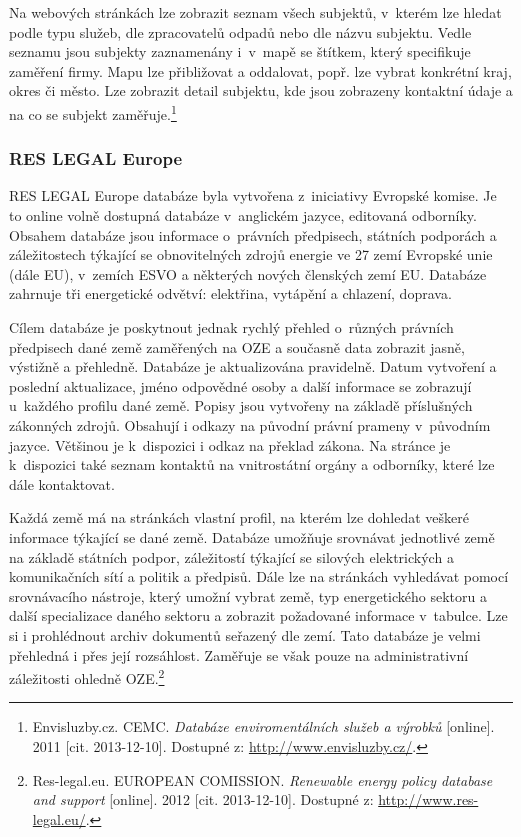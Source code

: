 \documentclass[11pt,a4paper]{article}
\begin{document}
Na webových stránkách lze zobrazit seznam všech subjektů, v~kterém lze hledat podle typu služeb, dle zpracovatelů odpadů nebo dle názvu subjektu. Vedle seznamu jsou subjekty zaznamenány i~v~mapě se štítkem, který specifikuje zaměření firmy. Mapu lze přibližovat a oddalovat, popř. lze vybrat konkrétní kraj, okres či město. Lze zobrazit detail subjektu, kde jsou zobrazeny kontaktní údaje a na co se subjekt zaměřuje.\footnote{Envisluzby.cz. CEMC. \textit{Databáze enviromentálních služeb a výrobků} [online]. 2011 [cit. 2013-12-10]. Dostupné z: \url{http://www.envisluzby.cz/}.}

\subsubsection{RES LEGAL Europe}
RES LEGAL Europe databáze byla vytvořena z~iniciativy Evropské komise. Je to online volně dostupná databáze v~anglickém jazyce, editovaná odborníky. Obsahem databáze jsou informace o~právních předpisech, státních podporách a záležitostech týkající se obnovitelných zdrojů energie ve 27 zemí Evropské unie (dále EU), v~zemích ESVO a některých nových členských zemí EU. Databáze zahrnuje tři energetické odvětví: elektřina, vytápění a chlazení, doprava.

Cílem databáze je poskytnout jednak rychlý přehled o~různých právních předpisech dané země zaměřených na OZE a současně data zobrazit jasně, výstižně a přehledně. Databáze je aktualizována pravidelně. Datum vytvoření a poslední aktualizace, jméno odpovědné osoby a další informace se zobrazují u~každého profilu dané země.
Popisy jsou vytvořeny na základě příslušných zákonných zdrojů. Obsahují i odkazy na původní právní prameny v~původním jazyce. Většinou je k~dispozici i odkaz na překlad zákona. Na stránce je k~dispozici také seznam kontaktů na vnitrostátní orgány a odborníky, které lze dále kontaktovat.

Každá země má na stránkách vlastní profil, na kterém lze dohledat veškeré informace týkající se dané země. Databáze umožňuje srovnávat jednotlivé země na základě státních podpor, záležitostí týkající se silových elektrických a komunikačních sítí a politik a předpisů. Dále lze na stránkách vyhledávat pomocí srovnávacího nástroje, který umožní vybrat země, typ energetického sektoru a další specializace daného sektoru a zobrazit požadované informace v~tabulce. Lze si i prohlédnout archiv dokumentů seřazený dle zemí. Tato databáze je velmi přehledná i přes její rozsáhlost. Zaměřuje se však pouze na administrativní záležitosti ohledně OZE.\footnote{Res-legal.eu. EUROPEAN COMISSION. \textit{Renewable energy policy database and support} [online]. 2012 [cit. 2013-12-10]. Dostupné z: \url{http://www.res-legal.eu/}.}
\end{document}
